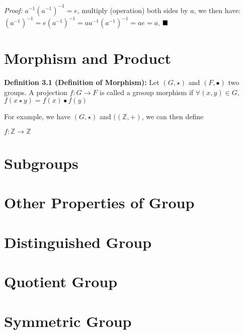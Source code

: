 \documentclass[12pt,openany]{book}
\theoremstyle{definition}
\theoremstyle{definition}
\begin{document}
\textit{Proof:} $a^{-1}(a^{-1})^{-1} = e$, multiply (operation) both sides by $a$, we then have: $(a^{-1})^{-1} = e(a^{-1})^{-1} = aa^{-1}(a^{-1})^{-1} = ae = a $. $\hfill\blacksquare$

\chapter{Morphism and Product}

\noindent\textbf{Definition 3.1 (Definition of Morphism):} Let $(G, \star)$ and $(F, \bullet)$ two groups. A projection $f: G \to F$ is called a grooup morphism if $\forall (x, y) \in G$, $f(x \star y) = f(x) \bullet f(y)$

For example, we have $(G, \star)$ and $((\mathbb{Z}, +)$, we can then define

$f: \mathbb{Z} \to \mathbb{Z}$

\chapter{Subgroups}

\chapter{Other Properties of Group}

\chapter{Distinguished Group}

\chapter{Quotient Group}

\chapter{Symmetric Group}
\end{document}
